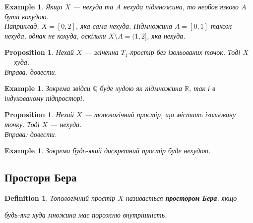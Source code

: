 \documentclass[a4paper, 10pt]{article}
\theoremstyle{theoremdd}
\newtheorem{definition}[theorem]{Definition}
\newtheorem{example}[theorem]{Example}
\newtheorem{proposition}[theorem]{Proposition}
\begin{document}
\begin{example}
Якщо $X$ --- нехуда та $A$ нехуда підмножина, то необов'язково $A$ бути кохудою.
\bigskip \\
Наприклад, $X = [0,2]$, яка сама нехуда. Підмножина $A = [0,1]$ також нехуда, однак не кохуда, оскільки $X \setminus A = (1,2]$, яка нехуда.
\end{example}

\begin{proposition}
Нехай $X$ --- зліченна $T_1$-простір без ізольованих точок. Тоді $X$ --- худа.\\
\textit{Вправа: довести}.
\end{proposition}

\begin{example}
Зокрема звідси $\mathbb{Q}$ буде худою як підмножина $\mathbb{R}$, так і в індукованому підпросторі.
\end{example}

\begin{proposition}
Нехай $X$ --- топологічний простір, що містить ізольовану точку. Тоді $X$ --- нехуда.\\
\textit{Вправа: довести}.
\end{proposition}

\begin{example}
Зокрема будь-який дискретний простір буде нехудою.
\end{example}

\subsection{Простори Бера}
\begin{definition}
Топологічний простір $X$ називається \textbf{простором Бера}, якщо
\begin{center}
будь-яка худа множина має порожню внутрішність.
\end{center}
\end{definition}
\end{document}
